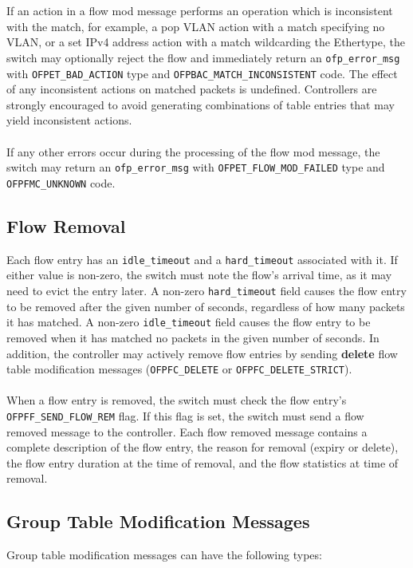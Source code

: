 \documentclass[10pt]{article}
\begin{document}
\\\\
If an action in a flow mod message performs an operation which is inconsistent with the match, for example, a pop VLAN action with a match specifying no VLAN, or a set IPv4 address action with a match wildcarding the Ethertype, the switch may optionally reject the flow and immediately return an \verb|ofp_error_msg| with \verb|OFPET_BAD_ACTION| type and \verb|OFPBAC_MATCH_INCONSISTENT| code.  The effect of any inconsistent actions on matched packets is undefined.  Controllers are strongly encouraged to avoid generating combinations of table entries that may yield inconsistent actions.
\\\\
If any other errors occur during the processing of the flow mod message, the switch may return an  \verb|ofp_error_msg| with \verb|OFPET_FLOW_MOD_FAILED| type and \verb|OFPFMC_UNKNOWN| code.

\subsection{Flow Removal}

Each flow entry has an \verb|idle_timeout| and a \verb|hard_timeout| associated with it.  If either value is non-zero, the switch must note the flow's arrival time, as it may need to evict the entry later.  A non-zero \verb|hard_timeout| field causes the flow entry to be removed after the given number of seconds, regardless of how many packets it has matched.  A non-zero \verb|idle_timeout| field causes the flow entry to be removed when it has matched no packets in the given number of seconds.  In addition, the controller may actively remove flow entries by sending \textbf{delete} flow table modification messages (\verb|OFPFC_DELETE| or \verb|OFPFC_DELETE_STRICT|).
\\\\
When a flow entry is removed, the switch must check the flow entry's \verb|OFPFF_SEND_FLOW_REM| flag.  If this flag is set, the switch must send a flow removed message to the controller.  Each flow removed message contains a complete description of the flow entry, the reason for removal (expiry or delete), the flow entry duration at the time of removal, and the flow statistics at time of removal.

\subsection{Group Table Modification Messages}
\label{group_table:sec_chan:group_mod}
\label{group_table:sec_chan:group_add}
\label{group_table:sec_chan:group_set}
\label{group_table:sec_chan:group_delete}
Group table modification messages can have the following types:

\end{document}
